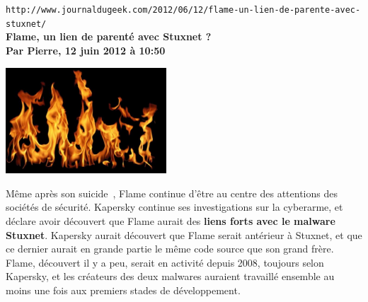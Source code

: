 \documentclass[11pt,twoside,a4paper]{article}
\begin{document}
\setlength\parindent{0pt}





\clearpage

\texttt{http://www.journaldugeek.com/2012/06/12/flame-un-lien-de-parente-avec-stuxnet/}~\\

\textbf{\LARGE Flame, un lien de parent{\'e} avec Stuxnet ?}~\\

\textbf{\small Par Pierre, 12 juin 2012 {\`a} 10:50}~\\

\begin{minipage}[ht]{6.25cm}	
	\includegraphics[width=6.00cm]{img/13ae95fb1-600x396.jpg}
\end{minipage} \hfill \begin{minipage}[ht]{12.50cm}
	\small
	M{\^e}me apr{\`e}s son suicide~\footnotemark, Flame continue d'{\^e}tre au centre des attentions des soci{\'e}t{\'e}s de s{\'e}curit{\'e}. Kapersky continue ses investigations sur la cyberarme, et d{\'e}clare avoir d{\'e}couvert que Flame aurait des \textbf{liens forts avec le malware Stuxnet}. Kapersky aurait d{\'e}couvert que Flame serait ant{\'e}rieur {\`a} Stuxnet, et que ce dernier aurait en grande partie le m{\^e}me code source que son grand fr{\`e}re.~\\
	
	Flame, d{\'e}couvert il y a peu, serait en activit{\'e} depuis 2008, toujours selon Kapersky, et les cr{\'e}ateurs des deux malwares auraient travaill{\'e} ensemble au moins une fois aux premiers stades de d{\'e}veloppement.~\\
\end{minipage}~\\
~
\end{document}
